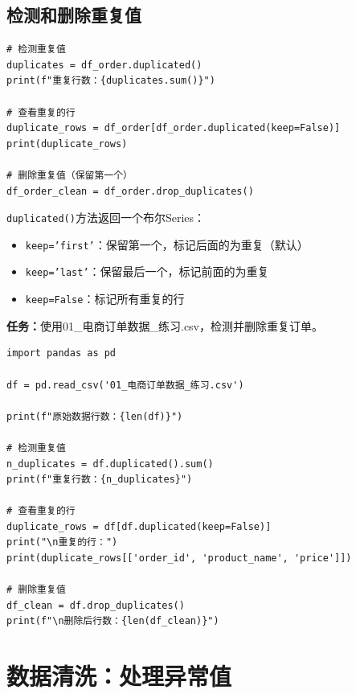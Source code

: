 \documentclass[12pt,a4paper]{article}
\begin{document}
\subsection{检测和删除重复值}

\begin{lstlisting}[caption={处理重复值}]
# 检测重复值
duplicates = df_order.duplicated()
print(f"重复行数：{duplicates.sum()}")

# 查看重复的行
duplicate_rows = df_order[df_order.duplicated(keep=False)]
print(duplicate_rows)

# 删除重复值（保留第一个）
df_order_clean = df_order.drop_duplicates()
\end{lstlisting}

\begin{knowledgebox}
\texttt{duplicated()}方法返回一个布尔Series：
\begin{itemize}
    \item \texttt{keep='first'}：保留第一个，标记后面的为重复（默认）
    \item \texttt{keep='last'}：保留最后一个，标记前面的为重复
    \item \texttt{keep=False}：标记所有重复的行
\end{itemize}
\end{knowledgebox}

\begin{practicebox}
\textbf{任务：}使用01\_电商订单数据\_练习.csv，检测并删除重复订单。

\begin{lstlisting}
import pandas as pd

df = pd.read_csv('01_电商订单数据_练习.csv')

print(f"原始数据行数：{len(df)}")

# 检测重复值
n_duplicates = df.duplicated().sum()
print(f"重复行数：{n_duplicates}")

# 查看重复的行
duplicate_rows = df[df.duplicated(keep=False)]
print("\n重复的行：")
print(duplicate_rows[['order_id', 'product_name', 'price']])

# 删除重复值
df_clean = df.drop_duplicates()
print(f"\n删除后行数：{len(df_clean)}")
\end{lstlisting}
\end{practicebox}

\section{数据清洗：处理异常值}
\end{document}
